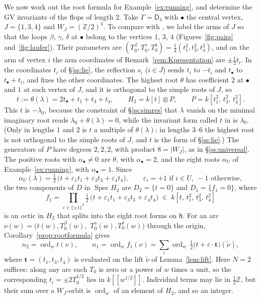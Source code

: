 \documentclass[11pt]{amsart}
\numberwithin{table}{section}
\numberwithin{figure}{section}
\numberwithin{equation}{section}
\theoremstyle{definition}
\theoremstyle{plain}
\newcommand{\h}{\mathfrak{h}}
\newcommand{\bul}{\bullet}
\newcommand{\Z}{\mathbb{Z}}
\DeclareMathOperator{\Spec}{Spec}
\DeclareMathOperator{\ord}{ord}
\newcommand{\tnu}{\tilde\nu}
\begin{document}
We now work out the root formula for Example~\ref{ex:running}, and determine the GV invariants of the flops of length $2$. Take $\Gamma = \mathsf{D}_4$ with $\bul$ the central vertex, $J = \{1, 3, 4\}$ and $W_J = (\Z/2)^3$. To compare with \cite[Example~4.23]{K}, we label the arms of $J$ so that the loops $\beta$, $\gamma$, $\delta$ at $\bul$ belong to the vertices $1$, $3$, $4$ (Figures~\ref{fig:pairs} and~\ref{fig:laufer}). Their parameters are $(T_0^\beta, T_0^\gamma, T_0^\delta) = \frac14(t_1^2, t_3^2, t_4^2)$, and on the arm of vertex $i$ the arm coordinates of Remark~\ref{rem:Kpresentation} are $\pm\frac12 t_i$. In the coordinates $t_i$ of \S\ref{ss:lie}, the reflection $s_i$ ($i \in J$) sends $t_i$ to $-t_i$ and $t_\bul$ to $t_\bul + t_i$, and fixes the other coordinates. The highest root $\theta$ has coefficient $2$ at $\bul$ and $1$ at each vertex of $J$, and it is orthogonal to the simple roots of $J$, so
\[
t := \theta(\lambda) = 2t_\bul + t_1 + t_3 + t_4, \qquad H_2 = k[t] \otimes P, \qquad P = k[t_1^2,\, t_3^2,\, t_4^2].
\]
This $t$ is $-\lambda_0$, because the constraint of \S\ref{ss:simres} that $\lambda$ vanish on the minimal imaginary root reads $\lambda_0 + \theta(\lambda) = 0$, while the invariant form called $t$ in \cite{K} is $\lambda_0$. (Only in lengths $1$ and $2$ is $t$ a multiple of $\theta(\lambda)$: in lengths $3$--$6$ the highest root is not orthogonal to the simple roots of $J$, and $t$ is the form of \S\ref{ss:lie}.) The generators of $P$ have degrees $2, 2, 2$, with product $8 = |W_J|$, as in \S\ref{ss:universal}. The positive roots with $\alpha_\bul \neq 0$ are $\theta$, with $\alpha_\bul = 2$, and the eight roots $\alpha_U$ of Example~\ref{ex:running}, with $\alpha_\bul = 1$. Since
\[
\alpha_U(\lambda) = \tfrac12\,\bigl(t + \varepsilon_1 t_1 + \varepsilon_3 t_3 + \varepsilon_4 t_4\bigr), \qquad \varepsilon_i = +1 \text{ if } i \in U,\ -1 \text{ otherwise},
\]
the two components of $D$ in $\Spec H_2$ are $D_2 = \{t = 0\}$ and $D_1 = \{f_1 = 0\}$, where
\[
f_1 = \prod_{\varepsilon \in \{\pm 1\}^3} \tfrac12\,\bigl(t + \varepsilon_1 t_1 + \varepsilon_3 t_3 + \varepsilon_4 t_4\bigr) \;\in\; k[t,\, t_1^2,\, t_3^2,\, t_4^2]
\]
is an octic in $H_2$ that splits into the eight root forms on $\h$. For an arc $\nu(w) = (t(w), T_0^\beta(w),$ $T_0^\gamma(w), T_0^\delta(w))$ through the origin, Corollary~\ref{prop:rootformula} gives
\[
n_2 = \ord_w t(\nu), \qquad n_1 = \ord_w f_1(\nu) = \sum_{\varepsilon} \ord_w\, \tfrac12\bigl(t + \varepsilon \cdot \mathbf t\bigr)(\tnu),
\]
where $\mathbf t = (t_1, t_3, t_4)$ is evaluated on the lift $\tnu$ of Lemma~\ref{lem:lift}. Here $N = 2$ suffices: along any arc each $T_0$ is zero or a power of $w$ times a unit, so the corresponding $t_i = \pm 2T_0^{1/2}$ lies in $k[[w^{1/2}]]$. Individual terms may lie in $\frac12\Z$, but their sum over a $W_J$-orbit is $\ord_w$ of an element of $H_2$, and so an integer.
\end{document}

